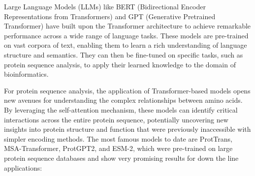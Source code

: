 Large Language Models (LLMs) like BERT (Bidirectional Encoder Representations from Transformers) and GPT (Generative Pretrained Transformer) have built upon the Transformer architecture to achieve remarkable performance across a wide range of language tasks. These models are pre-trained on vast corpora of text, enabling them to learn a rich understanding of language structure and semantics. They can then be fine-tuned on specific tasks, such as protein sequence analysis, to apply their learned knowledge to the domain of bioinformatics. \cite{devlin-etal-2019-bert,NEURIPS2020_1457c0d6}

For protein sequence analysis, the application of Transformer-based models opens new avenues for understanding the complex relationships between amino acids. By leveraging the self-attention mechanism, these models can identify critical interactions across the entire protein sequence, potentially uncovering new insights into protein structure and function that were previously inaccessible with simpler encoding methods. The most famous models to date are ProtTrans, MSA-Transformer, ProtGPT2, and ESM-2, which were pre-trained on large protein sequence databases and show very promising results for down the line applications:


